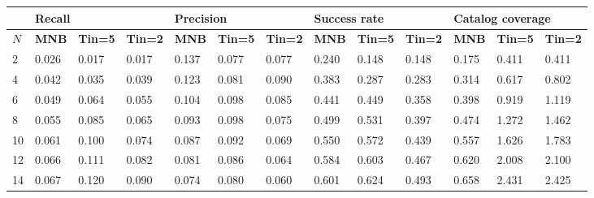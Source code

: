 \begin{table*}[]
	\small
\begin{tabular}{|l | lll| lll |lll |lll|}
	\hline
	& \multicolumn{3}{l|}{\textbf{Recall}} & \multicolumn{3}{l|}{\textbf{Precision}} & \multicolumn{3}{l|}{\textbf{Success rate}} & \multicolumn{3}{l|}{ \textbf{Catalog coverage}} \\ \hline
	$N$  & \textbf{MNB}     & \textbf{Tin=5}   & \textbf{Tin=2}  & \textbf{MNB}      & \textbf{Tin=5 }   & \textbf{Tin=2}   & \textbf{MNB}       & \textbf{Tin=5 }   & \textbf{Tin=2}    & \textbf{MNB}        & \textbf{Tin=5 }     & \textbf{Tin=2}      \\ \hline
                   
2                  & 0.026 & 0.017             & 0.017             & 0.137 & 0.077             & 0.077             & 0.240 & 0.148             & 0.148             & 0.175 & 0.411             & 0.411             \\ \hline
4                  & 0.042 & 0.035             & 0.039             & 0.123 & 0.081             & 0.090             & 0.383 & 0.287             & 0.283             & 0.314 & 0.617             & 0.802             \\ \hline
6                  & 0.049 & 0.064             & 0.055             & 0.104 & 0.098             & 0.085             & 0.441 & 0.449             & 0.358             & 0.398 & 0.919             & 1.119             \\ \hline
8                  & 0.055 & 0.085             & 0.065             & 0.093 & 0.098             & 0.075             & 0.499 & 0.531             & 0.397             & 0.474 & 1.272             & 1.462             \\ \hline
10                 & 0.061 & 0.100             & 0.074             & 0.087 & 0.092             & 0.069             & 0.550 & 0.572             & 0.439             & 0.557 & 1.626             & 1.783             \\ \hline
12                 & 0.066 & 0.111             & 0.082             & 0.081 & 0.086             & 0.064             & 0.584 & 0.603             & 0.467             & 0.620 & 2.008             & 2.100             \\ \hline
14                 & 0.067 & 0.120             & 0.090             & 0.074 & 0.080             & 0.060             & 0.601 & 0.624             & 0.493             & 0.658 & 2.431             & 2.425             \\ \hline

\end{tabular}
\end{table*}
